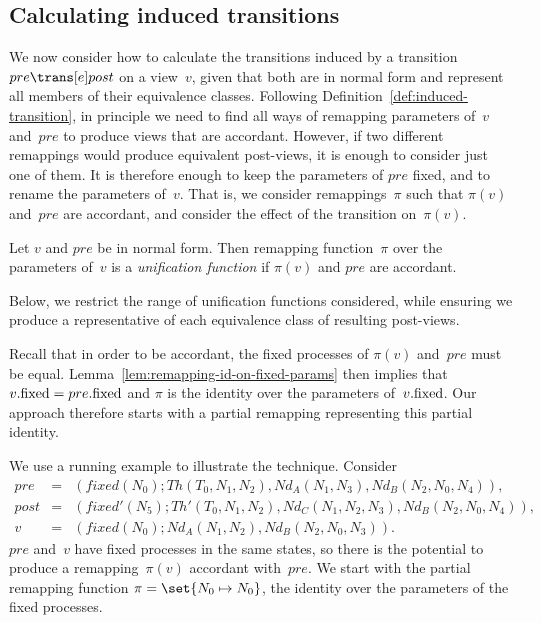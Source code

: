 \subsection{Calculating induced transitions}
\label{ssec:induced-symmetry}

We now consider how to calculate the transitions induced
by a transition $pre \trans[e] post$ on a view~$v$, given that both are in
normal form and represent all members of their equivalence classes.  
%
Following Definition~\ref{def:induced-transition}, in principle we need to
find all ways of remapping parameters of~$v$ and~$pre$ to produce views that
are accordant.  However, if two different remappings would produce equivalent
post-views, it is enough to consider just one of them.  It is therefore enough
to keep the parameters of $pre$ fixed, and to rename the parameters of~$v$.
That is, we consider remappings~$\pi$ such that $\pi(v)$ and~$pre$ are
accordant, and consider the effect of the transition on~$\pi(v)$.
%
\begin{definition}
Let $v$ and $pre$ be in normal form.  Then remapping function~$\pi$ over the
parameters of~$v$ is a \emph{unification function} if $\pi(v)$ and $pre$ are
accordant.
\end{definition}
%
Below, we restrict the range of unification functions considered, while
ensuring we produce a representative of each equivalence class of resulting
post-views.


Recall that in order to be accordant, the fixed processes of $\pi(v)$
and~$pre$ must be equal.  Lemma~\ref{lem:remapping-id-on-fixed-params} then
implies that $v.\mathrm{fixed} = pre.\mathrm{fixed}$ and $\pi$ is the identity over the
parameters of~$v.\mathrm{fixed}$.  Our approach therefore starts with a partial
remapping representing this partial identity.



\begin{example}
We use a running example to illustrate the technique.  Consider
\begin{eqnarray*}
pre & = &
   (fixed(N_0); Th(T_0, N_1, N_2), Nd_A(N_1, N_3), Nd_B(N_2, N_0, N_4)), 
\\
post & = & 
  (fixed'(N_5); Th'(T_0, N_1, N_2), Nd_C(N_1, N_2, N_3), Nd_B(N_2, N_0, N_4)) ,
\\
v & = & 
  (fixed(N_0); Nd_A(N_1, N_2), Nd_B(N_2, N_0, N_3)).
\end{eqnarray*}
%
$pre$ and~$v$ have fixed processes in the same states, so there is the
potential to produce a remapping~$\pi(v)$ accordant with~$pre$.  We start with
the partial remapping function $\pi = \set{N_0 \mapsto N_0}$, the identity over
the parameters of the fixed processes.
\end{example}

